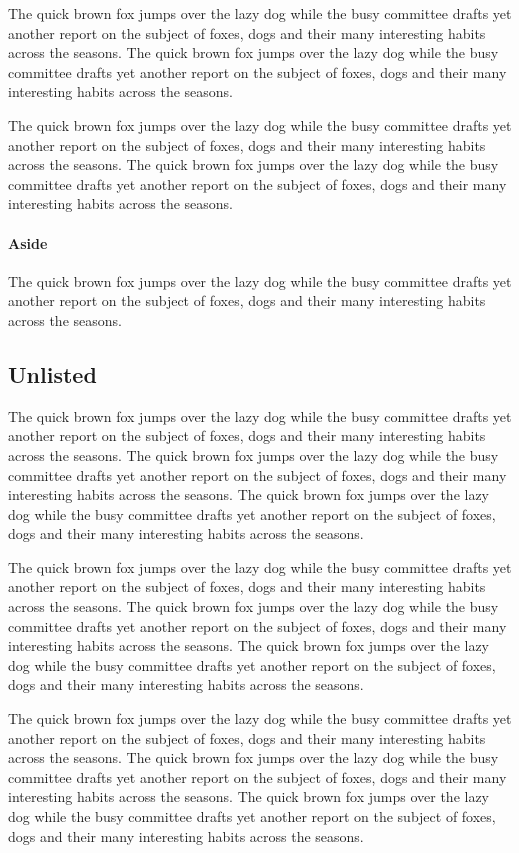 \documentclass{article}
\begin{document}
The quick brown fox jumps over the lazy dog while the busy committee drafts yet another report on the subject of foxes, dogs and their many interesting habits across the seasons. The quick brown fox jumps over the lazy dog while the busy committee drafts yet another report on the subject of foxes, dogs and their many interesting habits across the seasons. 

The quick brown fox jumps over the lazy dog while the busy committee drafts yet another report on the subject of foxes, dogs and their many interesting habits across the seasons. The quick brown fox jumps over the lazy dog while the busy committee drafts yet another report on the subject of foxes, dogs and their many interesting habits across the seasons. 

\paragraph{Aside} The quick brown fox jumps over the lazy dog while the busy committee drafts yet another report on the subject of foxes, dogs and their many interesting habits across the seasons. 
\subsection*{Unlisted}
The quick brown fox jumps over the lazy dog while the busy committee drafts yet another report on the subject of foxes, dogs and their many interesting habits across the seasons. The quick brown fox jumps over the lazy dog while the busy committee drafts yet another report on the subject of foxes, dogs and their many interesting habits across the seasons. The quick brown fox jumps over the lazy dog while the busy committee drafts yet another report on the subject of foxes, dogs and their many interesting habits across the seasons. 

The quick brown fox jumps over the lazy dog while the busy committee drafts yet another report on the subject of foxes, dogs and their many interesting habits across the seasons. The quick brown fox jumps over the lazy dog while the busy committee drafts yet another report on the subject of foxes, dogs and their many interesting habits across the seasons. The quick brown fox jumps over the lazy dog while the busy committee drafts yet another report on the subject of foxes, dogs and their many interesting habits across the seasons. 

The quick brown fox jumps over the lazy dog while the busy committee drafts yet another report on the subject of foxes, dogs and their many interesting habits across the seasons. The quick brown fox jumps over the lazy dog while the busy committee drafts yet another report on the subject of foxes, dogs and their many interesting habits across the seasons. The quick brown fox jumps over the lazy dog while the busy committee drafts yet another report on the subject of foxes, dogs and their many interesting habits across the seasons. 
\end{document}
